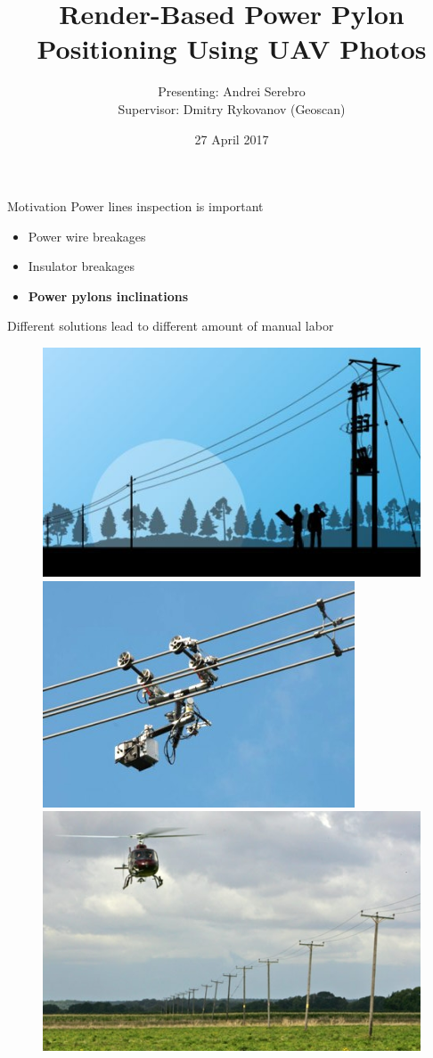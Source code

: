 \documentclass{beamer}
\author{Presenting: Andrei Serebro\\
Supervisor: Dmitry Rykovanov (Geoscan)}
\title{Render-Based Power Pylon Positioning Using UAV Photos}
\institute{St Petersburg Academic University}
\date[b]{27 April 2017}
\begin{document}
\begin{frame}[t,plain]
\titlepage
\end{frame}

\begin{frame}[t, fragile]{Motivation}
Power lines inspection is important
\begin{itemize}
\item Power wire breakages
\item Insulator  breakages
\item \textbf{Power pylons inclinations}
\end{itemize}

Different solutions lead to different amount of manual labor\\
\begin{figure}
\includegraphics[scale=0.23]{inspection_people}
  \hspace{0.1cm}
\includegraphics[scale=0.26]{inspection_robot}
  \hspace{0.1cm}
\includegraphics[scale=0.22]{inspection_helicopter}
\end{figure}
\end{frame}
\end{document}
